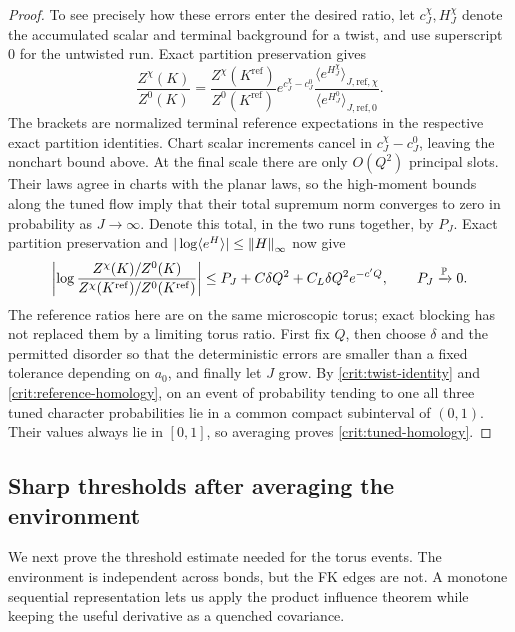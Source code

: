 \begin{proof}
To see precisely how these errors enter the desired ratio, let
$c_J^\chi,H_J^\chi$ denote the accumulated scalar and terminal
background for a twist, and use superscript $0$ for the untwisted
run.  Exact partition preservation gives
\begin{equation}\label{crit:terminal-ratio}
 \frac{Z^\chi(K)}{Z^0(K)}
 =\frac{Z^\chi(K^{\mathrm{ref}})}{Z^0(K^{\mathrm{ref}})}
       e^{c_J^\chi-c_J^0}
       \frac{\langle e^{H_J^\chi}\rangle_{J,\mathrm{ref},\chi}}
            {\langle e^{H_J^0}\rangle_{J,\mathrm{ref},0}}.
\end{equation}
The brackets are normalized terminal reference expectations in the
respective exact partition identities.  Chart scalar increments
cancel in $c_J^\chi-c_J^0$, leaving the nonchart bound above.
At the final scale there are only $O(Q^2)$ principal slots.  Their
laws agree in charts with the planar laws, so the high-moment bounds
along the tuned flow imply that their total supremum norm converges
to zero in probability as $J\to\infty$.  Denote this total, in the two
runs together, by $P_J$.  Exact partition preservation and
$|\log\langle e^H\rangle|\le\left\lVert H\right\rVert_\infty$ now give
\begin{equation}\label{crit:log-ratio-transfer}
 \left|\log\frac{Z^\chi(K)/Z^0(K)}
                         {Z^\chi(K^{\mathrm{ref}})/Z^0(K^{\mathrm{ref}})}
       \right|
 \le P_J+C\delta Q^2+C_L\delta Q^2e^{-c'Q},
 \qquad P_J\xrightarrow{\mathbb P}0.
\end{equation}
The reference ratios here are on the same microscopic torus; exact
blocking has not replaced them by a limiting torus ratio.
First fix $Q$, then choose $\delta$ and the permitted disorder so that
the deterministic errors are smaller than a fixed tolerance depending
on $a_0$, and finally let $J$ grow.  By
\eqref{crit:twist-identity} and \eqref{crit:reference-homology}, on an
event of probability tending to one all three tuned character
probabilities lie in a common compact subinterval of $(0,1)$.
Their values always lie in $[0,1]$, so averaging proves
\eqref{crit:tuned-homology}.
\end{proof}

\subsection{Sharp thresholds after averaging the environment}

We next prove the threshold estimate needed for the torus events.
The environment is independent across bonds, but the FK edges are
not.  A monotone sequential representation lets us apply the product
influence theorem while keeping the useful derivative as a quenched
covariance.

